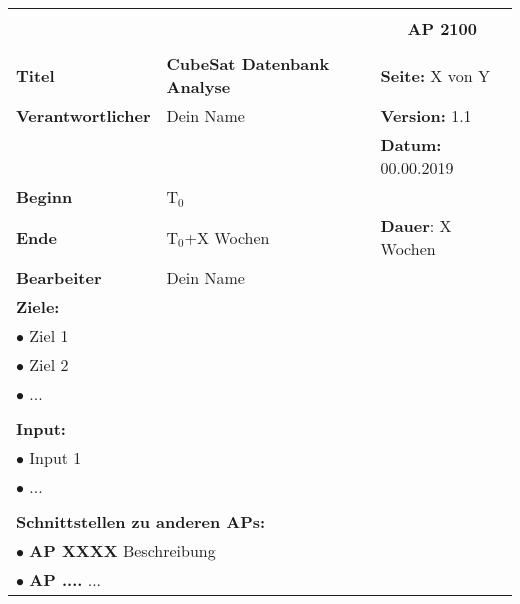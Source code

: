 \clearpage
\begin{table}[!h]
 \begin{center}
  \begin{tabular}{|p{35mm}||p{55mm}|p{50mm}||p{40mm}|}
   \hline
   \multicolumn{3}{|l||}{\textbf{}} & \multicolumn{1}{c|}{}\\
   \multicolumn{3}{|l||}{\textbf{}} & \multicolumn{1}{c|}{\textbf{AP 2100}}\\
   \multicolumn{3}{|l||}{\textbf{}} & \multicolumn{1}{c|}{}\\
   \hline\hline
   \textbf{Titel} & \multicolumn{2}{p{7cm}||}{\textbf{CubeSat Datenbank Analyse}} & \textbf{Seite:} X von Y\\
   \hline
   \textbf{Verantwortlicher} & \multicolumn{2}{l||}{Dein Name} & \textbf{Version:} 1.1\\
   \hline
   \multicolumn{3}{|l||}{} & \textbf{Datum:} 00.00.2019\\
   \hline\hline
   \textbf{Beginn} & \multicolumn{2}{l||}{T$_0$} & \\
   \hline
   \textbf{Ende} & \multicolumn{2}{l||}{T$_0$+X Wochen} & \textbf{Dauer}: X Wochen\\
   \hline\hline
   \textbf{Bearbeiter} & \multicolumn{3}{l|}{Dein Name}\\
   \hline\hline
   \multicolumn{4}{|p{150mm}|}{\textbf{Ziele:}}\\
   \multicolumn{4}{|p{150mm}|}{$\bullet$ Ziel 1}\\
   \multicolumn{4}{|p{150mm}|}{$\bullet$ Ziel 2}\\
   \multicolumn{4}{|p{150mm}|}{$\bullet$ ...}\\
   \multicolumn{4}{|p{150mm}|}{}\\
   \multicolumn{4}{|p{150mm}|}{\textbf{Input:}}\\
   \multicolumn{4}{|p{150mm}|}{$\bullet$ Input 1}\\
   \multicolumn{4}{|p{150mm}|}{$\bullet$ ...}\\
   \multicolumn{4}{|p{150mm}|}{}\\
   \multicolumn{4}{|p{150mm}|}{\textbf{Schnittstellen zu anderen APs:}}\\
   \multicolumn{4}{|p{150mm}|}{$\bullet$ \textbf{AP XXXX} Beschreibung}\\
   \multicolumn{4}{|p{150mm}|}{$\bullet$ \textbf{AP ....} ...}\\

\end{tabular}
\end{center}
\end{table}

